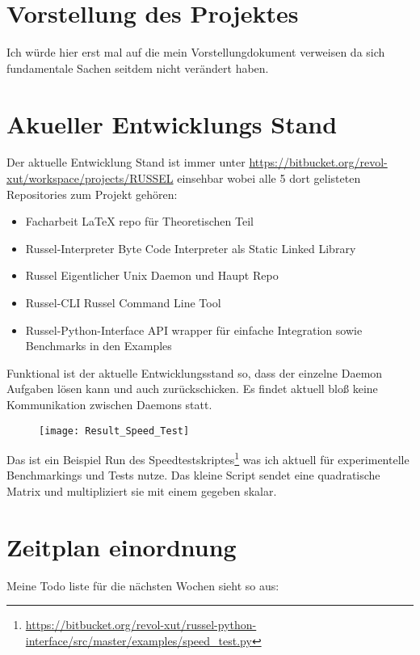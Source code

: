 \documentclass{article}
\begin{document}
\section*{ Vorstellung des Projektes }
Ich würde hier erst mal auf die mein Vorstellungdokument verweisen da sich fundamentale Sachen seitdem nicht verändert haben.


\section*{ Akueller Entwicklungs Stand }


Der aktuelle Entwicklung Stand ist immer unter \url{https://bitbucket.org/revol-xut/workspace/projects/RUSSEL} einsehbar wobei alle 5 dort gelisteten Repositories zum Projekt gehören:

\begin{itemize}
	\item Facharbeit LaTeX repo für Theoretischen Teil
	\item Russel-Interpreter Byte Code Interpreter als Static Linked Library 
	\item Russel Eigentlicher Unix Daemon und Haupt Repo
	\item Russel-CLI Russel Command Line Tool
	\item Russel-Python-Interface API wrapper für einfache Integration sowie Benchmarks in den Examples	
\end{itemize}

Funktional ist der aktuelle Entwicklungsstand so, dass der einzelne Daemon Aufgaben lösen kann und auch zurückschicken. Es findet aktuell bloß keine Kommunikation zwischen Daemons statt.

\begin{figure}[h]
	\centering
			
	 \texttt{[image: Result\_Speed\_Test]}
\end{figure}

Das ist ein Beispiel Run des Speedtestskriptes\footnote{\url{https://bitbucket.org/revol-xut/russel-python-interface/src/master/examples/speed_test.py}} was ich aktuell für experimentelle Benchmarkings und Tests nutze. Das kleine Script sendet eine quadratische Matrix und multipliziert sie mit einem gegeben skalar.


\section*{ Zeitplan einordnung }

Meine Todo liste für die nächsten Wochen sieht so aus:
\end{document}
